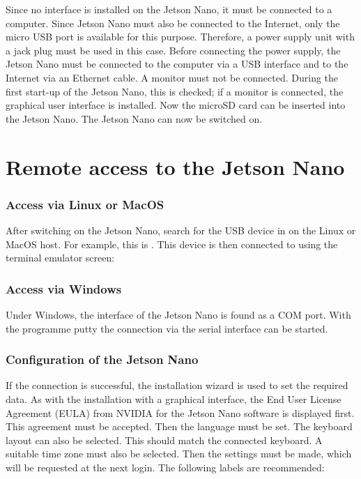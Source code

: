 Since no interface is installed on the Jetson Nano, it must be connected to a computer. Since Jetson Nano must also be connected to the Internet, only the micro USB port is available for this purpose. Therefore, a power supply unit with a jack plug must be used in this case. Before connecting the power supply, the Jetson Nano must be connected to the computer via a USB interface and to the Internet via an Ethernet cable. A monitor must not be connected. During the first start-up of the Jetson Nano, this is checked; if a monitor is connected, the graphical user interface is installed. Now the microSD card can be inserted into the Jetson Nano. The Jetson Nano can now be switched on.


\section{Remote access to the Jetson Nano}

\subsubsection{Access via Linux or MacOS}

After switching on the Jetson Nano, search for the USB device in  on the Linux or MacOS host. For example, this is . 
This device is then connected to using the terminal emulator \glqq screen\grqq{}:

\medskip


\subsubsection{Access via Windows}

Under Windows, the interface of the Jetson Nano is found as a COM port. With the programme \glqq putty\grqq{} the connection via the serial interface can be started.

\subsubsection{Configuration of the Jetson Nano}

If the connection is successful, the installation wizard  is used to set the required data. As with the installation with a graphical interface, the End User License Agreement (EULA) from NVIDIA for the Jetson Nano software is displayed first. This agreement must be accepted. Then the language must be set. The keyboard layout can also be selected. This should match the connected keyboard. A suitable time zone must also be selected. Then the settings must be made, which will be requested at the next login. The following labels are recommended:

